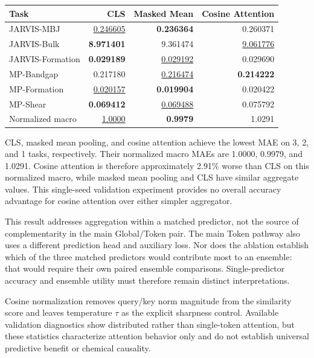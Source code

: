 \documentclass[a4paper,fleqn]{cas-sc}
\begin{document}
\begin{center}
\begin{minipage}{\linewidth}
\label{tab:matched_text}\centering\small
\begin{tabular}{lrrr}\toprule
Task&CLS&Masked Mean&Cosine Attention\\\midrule
JARVIS-MBJ&\underline{0.246605}&\textbf{0.236364}&0.260371\\
JARVIS-Bulk&\textbf{8.971401}&9.361474&\underline{9.061776}\\
JARVIS-Formation&\textbf{0.029189}&\underline{0.029192}&0.029690\\
MP-Bandgap&0.217180&\underline{0.216474}&\textbf{0.214222}\\
MP-Formation&\underline{0.020157}&\textbf{0.019904}&0.020422\\
MP-Shear&\textbf{0.069412}&\underline{0.069488}&0.075792\\\midrule
Normalized macro&\underline{1.0000}&\textbf{0.9979}&1.0291\\\bottomrule
\end{tabular}
\end{minipage}
\end{center}

CLS, masked mean pooling, and cosine attention achieve the lowest MAE on 3, 2, and 1 tasks, respectively. Their normalized macro MAEs are 1.0000, 0.9979, and 1.0291. Cosine attention is therefore approximately 2.91\% worse than CLS on this normalized macro, while masked mean pooling and CLS have similar aggregate values. This single-seed validation experiment provides no overall accuracy advantage for cosine attention over either simpler aggregator.

This result addresses aggregation within a matched predictor, not the source of complementarity in the main Global/Token pair. The main Token pathway also uses a different prediction head and auxiliary loss. Nor does the ablation establish which of the three matched predictors would contribute most to an ensemble: that would require their own paired ensemble comparisons. Single-predictor accuracy and ensemble utility must therefore remain distinct interpretations.

Cosine normalization removes query/key norm magnitude from the similarity score and leaves temperature $\tau$ as the explicit sharpness control. Available validation diagnostics show distributed rather than single-token attention, but these statistics characterize attention behavior only and do not establish universal predictive benefit or chemical causality.
\end{document}
